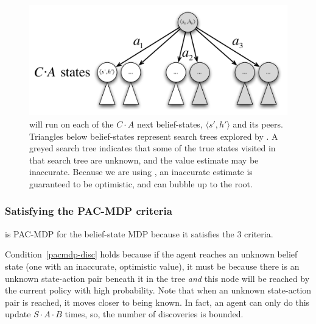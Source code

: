\begin{figure}
\vskip 0.2in
\begin{center}
\centerline{\includegraphics[scale=0.5]{figures/bfs3tree}}
\caption{
 will run  on each of the $C\cdot A$ next belief-states, $\langle s', h' \rangle$ and its peers. Triangles below belief-states represent search trees explored by . A greyed search tree indicates that some of the true states visited in that search tree are unknown, and the value estimate may be inaccurate. Because we are using , an inaccurate estimate is guaranteed to be optimistic, and can bubble up to the root.
}
\label{fig:bfs3tree}
\end{center}
\vskip -0.2in
\end{figure} 

\subsubsection{Satisfying the PAC-MDP criteria}

 is PAC-MDP for the belief-state MDP because it satisfies the 3 criteria.

Condition~\ref{pacmdp-disc} holds because if the agent reaches an unknown belief state (one with an inaccurate, optimistic value), it must be because there is an unknown state-action pair beneath it in the tree \emph{and} this node will be reached by the current policy with high probability.
 Note that when an unknown state-action pair is reached, it moves closer to being known.  In fact, an agent can only do this update $S\cdot A \cdot B$ times, so, the number of discoveries is bounded.


